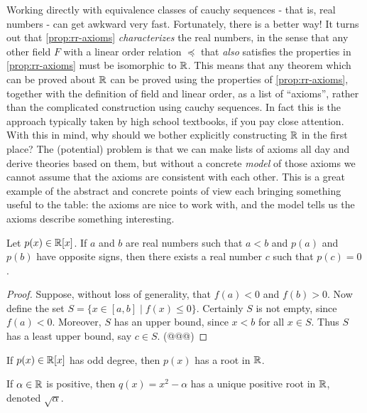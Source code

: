 Working directly with equivalence classes of cauchy sequences - that is, real numbers - can get awkward very fast.
Fortunately, there is a better way! It turns out that \ref{prop:rr-axioms} \emph{characterizes} the real numbers, in the sense that any other field \(F\) with a linear order relation \(\preceq\) that \emph{also} satisfies the properties in \ref{prop:rr-axioms} must be isomorphic to \(\mathbb{R}\).
This means that any theorem which can be proved about \(\mathbb{R}\) can be proved using the properties of \ref{prop:rr-axioms}, together with the definition of field and linear order, as a list of ``axioms'', rather than the complicated construction using cauchy sequences.
In fact this is the approach typically taken by high school textbooks, if you pay close attention.
With this in mind, why should we bother explicitly constructing \(\mathbb{R}\) in the first place? The (potential) problem is that we can make lists of axioms all day and derive theories based on them, but without a concrete \emph{model} of those axioms we cannot assume that the axioms are consistent with each other.
This is a great example of the abstract and concrete points of view each bringing something useful to the table: the axioms are nice to work with, and the model tells us the axioms describe something interesting.

\begin{prop}
Let \(p(x) \in \mathbb{R}[x]\).
If \(a\) and \(b\) are real numbers such that \(a < b\) and \(p(a)\) and \(p(b)\) have opposite signs, then there exists a real number \(c\) such that \(p(c) = 0\).
\end{prop}

\begin{proof}
Suppose, without loss of generality, that \(f(a) < 0\) and \(f(b) > 0\).
Now define the set \(S = \{ x \in [a,b] \mid f(x) \leq 0 \}\).
Certainly \(S\) is not empty, since \(f(a) < 0\).
Moreover, \(S\) has an upper bound, since \(x < b\) for all \(x \in S\).
Thus \(S\) has a least upper bound, say \(c \in S\).
(@@@)
\end{proof}

\begin{cor}\mbox{}
\begin{proplist}
\item If \(p(x) \in \mathbb{R}[x]\) has odd degree, then \(p(x)\) has a root in \(\mathbb{R}\).
\item If \(\alpha \in \mathbb{R}\) is positive, then \(q(x) = x^2 - \alpha\) has a unique positive root in \(\mathbb{R}\), denoted \(\sqrt{\alpha}\).
\end{proplist}
\end{cor}

